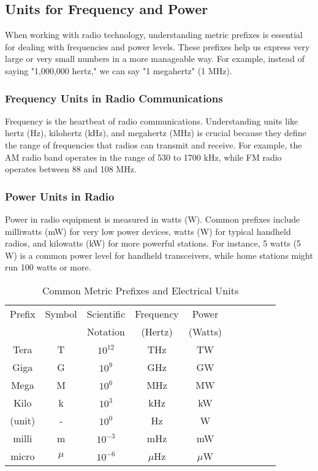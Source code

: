 \subsection{Units for Frequency and Power}
\label{subsec:minimal-metric}

When working with radio technology, understanding metric prefixes is essential for dealing with frequencies and power levels. These prefixes help us express very large or very small numbers in a more manageable way. For example, instead of saying "1,000,000 hertz," we can say "1 megahertz" (1 MHz).

\subsubsection*{Frequency Units in Radio Communications}
Frequency is the heartbeat of radio communications. Understanding units like hertz (Hz), kilohertz (kHz), and megahertz (MHz) is crucial because they define the range of frequencies that radios can transmit and receive. For example, the AM radio band operates in the range of 530 to 1700 kHz, while FM radio operates between 88 and 108 MHz.

\subsubsection*{Power Units in Radio}
Power in radio equipment is measured in watts (W). Common prefixes include milliwatts (mW) for very low power devices, watts (W) for typical handheld radios, and kilowatts (kW) for more powerful stations. For instance, 5 watts (5 W) is a common power level for handheld transceivers, while home stations might run 100 watts or more.

\begin{table}[htbp]
    \centering
    \caption{Common Metric Prefixes and Electrical Units}
    \label{tab:power-freq-metric-prefixes}
    \scriptsize
    \begin{tabular}{|c|c|c|c|c|c|c|c|c|c|}
        \hline
        Prefix & Symbol & Scientific & Frequency & Power \\
        & & Notation &  (Hertz) & (Watts) \\
        \hline
        Tera & T & $10^{12}$ & THz & TW \\
        Giga & G & $10^9$ & GHz & GW \\
        Mega & M & $10^6$ & MHz & MW \\
        Kilo & k & $10^3$ & kHz & kW \\
        \hline
        (unit) & - & $10^0$ & Hz & W \\
        \hline
        milli & m & $10^{-3}$ & mHz & mW \\
        micro & $\mu$ & $10^{-6}$ & $\mu$Hz & $\mu$W \\
        \hline
    \end{tabular}
\end{table}

